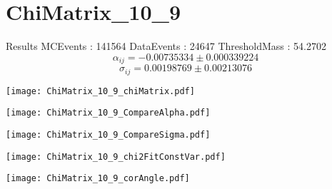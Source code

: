 \documentclass[a4paper,12pt]{article}
\begin{document}
\section{ChiMatrix\_10\_9}
\begin{minipage}{0.49\linewidth} Results \newline
MCEvents : 141564\newline
DataEvents : 24647 \newline
ThresholdMass : 54.2702\\
$$\alpha_{ij} = -0.00735334\pm 0.000339224$$
$$\sigma_{ij} = 0.00198769\pm 0.00213076$$
\end{minipage}\hfill
\begin{minipage}{0.49\linewidth} 
\texttt{[image: ChiMatrix\_10\_9\_chiMatrix.pdf]}\\
\end{minipage}
\hfill
\begin{minipage}{0.49\linewidth} 
\texttt{[image: ChiMatrix\_10\_9\_CompareAlpha.pdf]}\\
\end{minipage}
\hfill
\begin{minipage}{0.49\linewidth} 
\texttt{[image: ChiMatrix\_10\_9\_CompareSigma.pdf]}\\
\end{minipage}
\begin{minipage}{0.49\linewidth} 
\texttt{[image: ChiMatrix\_10\_9\_chi2FitConstVar.pdf]}\\
\end{minipage}
\hfill
\begin{minipage}{0.49\linewidth} 
\texttt{[image: ChiMatrix\_10\_9\_corAngle.pdf]}\\
\end{minipage}
\end{document}
